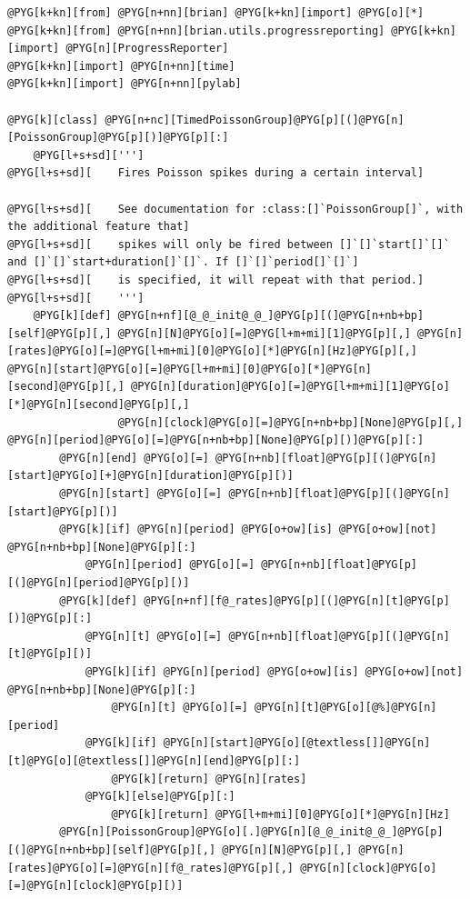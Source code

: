\documentclass[letterpaper,10pt,english]{manual}
\begin{document}
\begin{Verbatim}[commandchars=@\[\]]
@PYG[k+kn][from] @PYG[n+nn][brian] @PYG[k+kn][import] @PYG[o][*]
@PYG[k+kn][from] @PYG[n+nn][brian.utils.progressreporting] @PYG[k+kn][import] @PYG[n][ProgressReporter]
@PYG[k+kn][import] @PYG[n+nn][time]
@PYG[k+kn][import] @PYG[n+nn][pylab]

@PYG[k][class] @PYG[n+nc][TimedPoissonGroup]@PYG[p][(]@PYG[n][PoissonGroup]@PYG[p][)]@PYG[p][:]
    @PYG[l+s+sd][''']
@PYG[l+s+sd][    Fires Poisson spikes during a certain interval]

@PYG[l+s+sd][    See documentation for :class:[]`PoissonGroup[]`, with the additional feature that]
@PYG[l+s+sd][    spikes will only be fired between []`[]`start[]`[]` and []`[]`start+duration[]`[]`. If []`[]`period[]`[]`]
@PYG[l+s+sd][    is specified, it will repeat with that period.]
@PYG[l+s+sd][    ''']
    @PYG[k][def] @PYG[n+nf][@_@_init@_@_]@PYG[p][(]@PYG[n+nb+bp][self]@PYG[p][,] @PYG[n][N]@PYG[o][=]@PYG[l+m+mi][1]@PYG[p][,] @PYG[n][rates]@PYG[o][=]@PYG[l+m+mi][0]@PYG[o][*]@PYG[n][Hz]@PYG[p][,] @PYG[n][start]@PYG[o][=]@PYG[l+m+mi][0]@PYG[o][*]@PYG[n][second]@PYG[p][,] @PYG[n][duration]@PYG[o][=]@PYG[l+m+mi][1]@PYG[o][*]@PYG[n][second]@PYG[p][,]
                 @PYG[n][clock]@PYG[o][=]@PYG[n+nb+bp][None]@PYG[p][,] @PYG[n][period]@PYG[o][=]@PYG[n+nb+bp][None]@PYG[p][)]@PYG[p][:]
        @PYG[n][end] @PYG[o][=] @PYG[n+nb][float]@PYG[p][(]@PYG[n][start]@PYG[o][+]@PYG[n][duration]@PYG[p][)]
        @PYG[n][start] @PYG[o][=] @PYG[n+nb][float]@PYG[p][(]@PYG[n][start]@PYG[p][)]
        @PYG[k][if] @PYG[n][period] @PYG[o+ow][is] @PYG[o+ow][not] @PYG[n+nb+bp][None]@PYG[p][:]
            @PYG[n][period] @PYG[o][=] @PYG[n+nb][float]@PYG[p][(]@PYG[n][period]@PYG[p][)]
        @PYG[k][def] @PYG[n+nf][f@_rates]@PYG[p][(]@PYG[n][t]@PYG[p][)]@PYG[p][:]
            @PYG[n][t] @PYG[o][=] @PYG[n+nb][float]@PYG[p][(]@PYG[n][t]@PYG[p][)]
            @PYG[k][if] @PYG[n][period] @PYG[o+ow][is] @PYG[o+ow][not] @PYG[n+nb+bp][None]@PYG[p][:]
                @PYG[n][t] @PYG[o][=] @PYG[n][t]@PYG[o][@%]@PYG[n][period]
            @PYG[k][if] @PYG[n][start]@PYG[o][@textless[]]@PYG[n][t]@PYG[o][@textless[]]@PYG[n][end]@PYG[p][:]
                @PYG[k][return] @PYG[n][rates]
            @PYG[k][else]@PYG[p][:]
                @PYG[k][return] @PYG[l+m+mi][0]@PYG[o][*]@PYG[n][Hz]
        @PYG[n][PoissonGroup]@PYG[o][.]@PYG[n][@_@_init@_@_]@PYG[p][(]@PYG[n+nb+bp][self]@PYG[p][,] @PYG[n][N]@PYG[p][,] @PYG[n][rates]@PYG[o][=]@PYG[n][f@_rates]@PYG[p][,] @PYG[n][clock]@PYG[o][=]@PYG[n][clock]@PYG[p][)]


\end{Verbatim}
\end{document}
